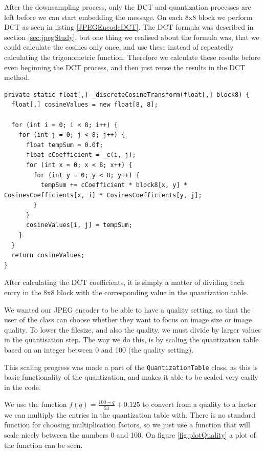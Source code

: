 After the downsampling process, only the DCT and quantization processes are left before we can start embedding the message.
On each 8x8 block we perform DCT as seen in listing \ref{JPEGEncodeDCT}.
The DCT formula was described in section \ref{sec:jpegStudy}, but one thing we realised about the formula was, that we could calculate the cosines only once, and use these instead of repeatedly calculating the trigonometric function. Therefore we calculate these results before even beginning the DCT process, and then just reuse the results in the DCT method.
 

\begin{lstlisting}[firstnumber=618,label=JPEGEncodeDCT, caption={Multidimensional DCT on 8x8 block \textbf{File: }JPEGImage.cs}]
private static float[,] _discreteCosineTransform(float[,] block8) {
  float[,] cosineValues = new float[8, 8];

  for (int i = 0; i < 8; i++) {
    for (int j = 0; j < 8; j++) {
      float tempSum = 0.0f;
      float cCoefficient = _c(i, j);
      for (int x = 0; x < 8; x++) {
        for (int y = 0; y < 8; y++) {
          tempSum += cCoefficient * block8[x, y] * CosinesCoefficients[x, i] * CosinesCoefficients[y, j];
        }
      }
      cosineValues[i, j] = tempSum;
    }
  }
  return cosineValues;
}
\end{lstlisting}

\FloatBarrier

After calculating the DCT coefficients, it is simply a matter of dividing each entry in the 8x8 block with the corresponding value in the quantization table.

We wanted our JPEG encoder to be able to have a quality setting, so that the user of the class can choose whether they want to focus on image size or image quality.
To lower the filesize, and also the quality, we must divide by larger values in the quantisation step.
The way we do this, is by scaling the quantization table based on an integer between 0 and 100 (the quality setting).

This scaling progress was made a part of the \lstinline|QuantizationTable| class, as this is basic functionality of the quantization, and makes it able to be scaled very easily in the code.

We use the function $f(q) = \frac{100-q}{53}+0.125$ to convert from a quality to a factor we can multiply the entries in the quantization table with.
There is no standard function for choosing multiplication factors, so we just use a function that will scale nicely between the numbers 0 and 100.
On figure \ref{fig:plotQuality} a plot of the function can be seen.

